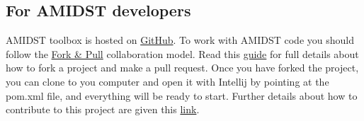 \documentclass[10pt,a4paper]{article}
\begin{document}
\subsection{For AMIDST developers }\label{for-amidst-developers}

AMIDST toolbox is hosted on
\href{https://github.com/amidst/toolbox}{GitHub}. To work with AMIDST
code you should follow the
\href{https://help.github.com/articles/using-pull-requests/}{Fork \&
	Pull} collaboration model. Read this
\href{https://guides.github.com/activities/forking/}{guide} for full
details about how to fork a project and make a pull request. Once you
have forked the project, you can clone to you computer and open it with
Intellij by pointing at the pom.xml file, and everything will be ready
to start. Further details about how to contribute to this project are given this
\href{http://amidst.github.io/toolbox/ContributingToAMIDST.html}{link}.
\end{document}
